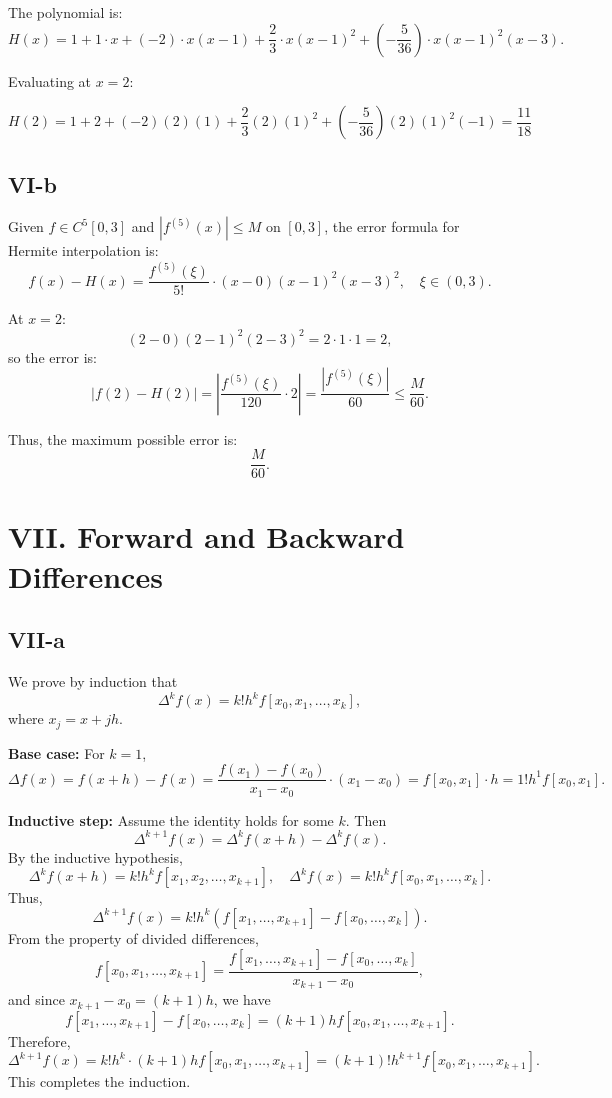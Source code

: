 \documentclass[a4paper]{article}
\begin{document}
The polynomial is:
\[
H(x) = 1 + 1 \cdot x + (-2) \cdot x(x-1) + \frac{2}{3} \cdot x(x-1)^2 + \left(-\frac{5}{36}\right) \cdot x(x-1)^2(x-3).
\]

Evaluating at \( x = 2 \):

$$H(2) = 1 + 2 + (-2)(2)(1) + \frac{2}{3}(2)(1)^2 + \left(-\frac{5}{36}\right)(2)(1)^2(-1) = \frac{11}{18}$$


\subsection*{VI-b}

Given \( f \in C^5[0, 3] \) and \( |f^{(5)}(x)| \leq M \) on \([0, 3]\), the error formula for Hermite interpolation is:
\[
f(x) - H(x) = \frac{f^{(5)}(\xi)}{5!} \cdot (x - 0)(x - 1)^2(x - 3)^2, \quad \xi \in (0, 3).
\]

At \( x = 2 \):
\[
(2 - 0)(2 - 1)^2(2 - 3)^2 = 2 \cdot 1 \cdot 1 = 2,
\]
so the error is:
\[
|f(2) - H(2)| = \left| \frac{f^{(5)}(\xi)}{120} \cdot 2 \right| = \frac{|f^{(5)}(\xi)|}{60} \leq \frac{M}{60}.
\]

Thus, the maximum possible error is:
\[
\frac{M}{60}.
\]

\section*{VII. Forward and Backward Differences}

\subsection*{VII-a}

We prove by induction that
\[
\Delta^k f(x) = k! h^k f[x_0, x_1, \ldots, x_k],
\]
where \( x_j = x + jh \).

\textbf{Base case:} For \( k = 1 \),
\[
\Delta f(x) = f(x+h) - f(x) = \frac{f(x_1) - f(x_0)}{x_1 - x_0} \cdot (x_1 - x_0) = f[x_0, x_1] \cdot h = 1! h^1 f[x_0, x_1].
\]

\textbf{Inductive step:} Assume the identity holds for some \( k \). Then
\[
\Delta^{k+1} f(x) = \Delta^k f(x+h) - \Delta^k f(x).
\]
By the inductive hypothesis,
\[
\Delta^k f(x+h) = k! h^k f[x_1, x_2, \ldots, x_{k+1}], \quad \Delta^k f(x) = k! h^k f[x_0, x_1, \ldots, x_k].
\]
Thus,
\[
\Delta^{k+1} f(x) = k! h^k \left( f[x_1, \ldots, x_{k+1}] - f[x_0, \ldots, x_k] \right).
\]
From the property of divided differences,
\[
f[x_0, x_1, \ldots, x_{k+1}] = \frac{f[x_1, \ldots, x_{k+1}] - f[x_0, \ldots, x_k]}{x_{k+1} - x_0},
\]
and since \( x_{k+1} - x_0 = (k+1)h \), we have
\[
f[x_1, \ldots, x_{k+1}] - f[x_0, \ldots, x_k] = (k+1)h f[x_0, x_1, \ldots, x_{k+1}].
\]
Therefore,
\[
\Delta^{k+1} f(x) = k! h^k \cdot (k+1)h f[x_0, x_1, \ldots, x_{k+1}] = (k+1)! h^{k+1} f[x_0, x_1, \ldots, x_{k+1}].
\]
This completes the induction.
\end{document}
